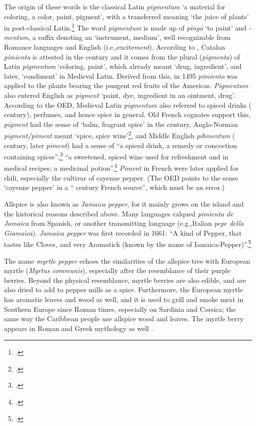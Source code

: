 The origin of these words is the classical Latin \textit{pigmentum} `a material for coloring, a color, paint, pigment', with a transferred meaning `the juice of plants' in post-classical Latin.\footcite[pigmentum ]{lewis_latin_1879} The word \textit{pigmentum} is made up of \textit{pingō} `to paint' and \textit{-mentum}, a suffix denoting an `instrument, medium', well recognizable from Romance languages and English (i.e.,excite\textit{ment}).
According to \textcite[459]{corominas_breve_1987}, Catalan \textit{pimienta} is attested in the  century and it comes from the plural (\textit{pigmenta}) of Latin \textit{pigmentum} `coloring, paint', which already meant `drug, ingredient', and later, `condiment' in Medieval Latin. Derived from this, in 1495 \textit{pimiento} was applied to the plants bearing the pungent red fruits of the Americas. \textit{Pigmentum} also entered English as \textit{pigment} `paint, dye, ingredient in an ointment, drug'. According to the \gls{OED}, Medieval Latin \textit{pigmentum} also referred to spiced drinks ( century), perfumes, and hence spice in general. Old French cognates support this, \textit{pigment} had the sense of `balm, fragrant spice' in the  century, Anglo-Norman \textit{pigment/piment} meant `spice, spice wine'\footcite[pigment]{oed}, and Middle English \textit{pihmentum} ( century, later \textit{piment}) had a sense of ``a spiced drink, a remedy or concoction containing spices'',\footcite[pigment]{oe} ``a sweetened, spiced wine used for refreshment and in medical recipes; a medicinal potion''.\footcite[piment]{med} \textit{Piment} in French were later applied for chili, especially the cultivar of cayenne pepper. (The \gls{OED} points to the sense `cayenne pepper' in a `` century French source'', which must be an error.)


Allspice is also known as \textit{Jamaica pepper}, for it mainly grows on the island and the historical reasons described above. Many languages calqued \textit{pimienta de Jamaica} from Spanish, or another transmitting language (e.g.,Italian \textit{pepe della Giamaica}). \textit{Jamaica pepper} was first recorded in 1661: ``A kind of Pepper, that tastes like Cloves, and very Aromatick (known by the name of Iamaica-Pepper)''.\footcite[Jamaica]{oed}

The name \textit{myrtle pepper}  echoes the similarities of the allspice tree with European myrtle (\textit{Myrtus communis}), especially after the resemblance of their purple berries. Beyond the physical resemblance, myrtle berries are also edible, and are also dried to add to pepper mills as a spice. Furthermore, the European myrtle has aromatic leaves and wood as well, and it is used to grill and smoke meat in Southern Europe since Roman times, especially on Sardinia and Corsica; the same way the Caribbean people use allspice wood and leaves. The myrtle berry appears in Roman and Greek mythology as well \autocite[186]{van_wyk_culinary_2014}.

